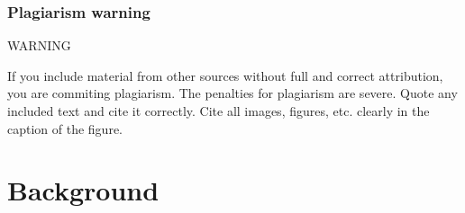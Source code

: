 \documentclass{l4proj}
\begin{document}



\subsection{Plagiarism warning}

\begin{highlight_title}{WARNING}
    
    If you include material from other sources without full and correct attribution, you are commiting plagiarism. The penalties for plagiarism are severe.
    Quote any included text and cite it correctly. Cite all images, figures, etc. clearly in the caption of the figure.
\end{highlight_title}


\chapter{Background}
\end{document}
